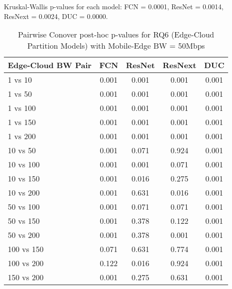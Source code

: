 \begin{table}[h]
\centering
\caption{Pairwise Conover post-hoc p-values for RQ6 (Edge-Cloud Partition Models) with Mobile-Edge BW = 50Mbps}
\label{tab:conover_edge_cloud_partition_me50}
\smallskip
Kruskal-Wallis p-values for each model: FCN = 0.0001, ResNet = 0.0014, ResNext = 0.0024, DUC = 0.0000.

\begin{tabular}{lcccc}
\toprule
Edge-Cloud BW Pair & FCN & ResNet & ResNext & DUC \\
\midrule
1 vs 10 & 0.001 & 0.001 & 0.001 & 0.001 \\
1 vs 50 & 0.001 & 0.001 & 0.001 & 0.001 \\
1 vs 100 & 0.001 & 0.001 & 0.001 & 0.001 \\
1 vs 150 & 0.001 & 0.001 & 0.001 & 0.001 \\
1 vs 200 & 0.001 & 0.001 & 0.001 & 0.001 \\
10 vs 50 & 0.001 & 0.071 & 0.924 & 0.001 \\
10 vs 100 & 0.001 & 0.001 & 0.071 & 0.001 \\
10 vs 150 & 0.001 & 0.016 & 0.275 & 0.001 \\
10 vs 200 & 0.001 & 0.631 & 0.016 & 0.001 \\
50 vs 100 & 0.001 & 0.071 & 0.071 & 0.001 \\
50 vs 150 & 0.001 & 0.378 & 0.122 & 0.001 \\
50 vs 200 & 0.001 & 0.378 & 0.001 & 0.001 \\
100 vs 150 & 0.071 & 0.631 & 0.774 & 0.001 \\
100 vs 200 & 0.122 & 0.016 & 0.924 & 0.001 \\
150 vs 200 & 0.001 & 0.275 & 0.631 & 0.001 \\
\bottomrule
\end{tabular}
\end{table}

